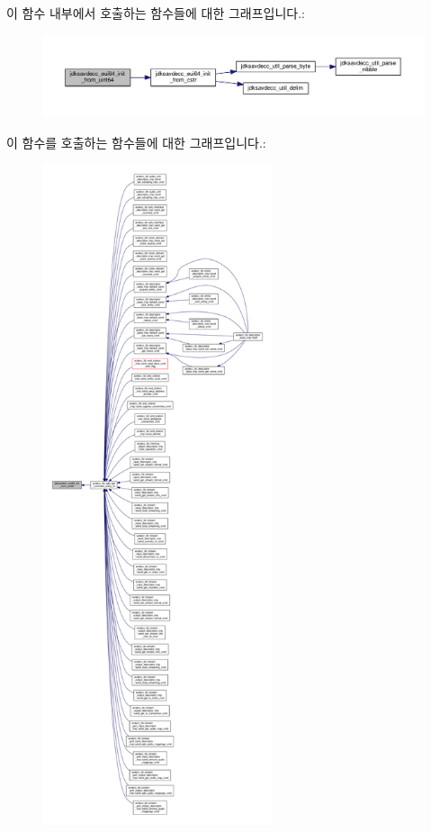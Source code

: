 이 함수 내부에서 호출하는 함수들에 대한 그래프입니다.\+:
\nopagebreak
\begin{figure}[H]
\begin{center}
\leavevmode
\includegraphics[width=350pt]{group__eui64_gae410f4c2dc9cbd68690e1a09912ee4f3_cgraph}
\end{center}
\end{figure}




이 함수를 호출하는 함수들에 대한 그래프입니다.\+:
\nopagebreak
\begin{figure}[H]
\begin{center}
\leavevmode
\includegraphics[height=550pt]{group__eui64_gae410f4c2dc9cbd68690e1a09912ee4f3_icgraph}
\end{center}
\end{figure}


